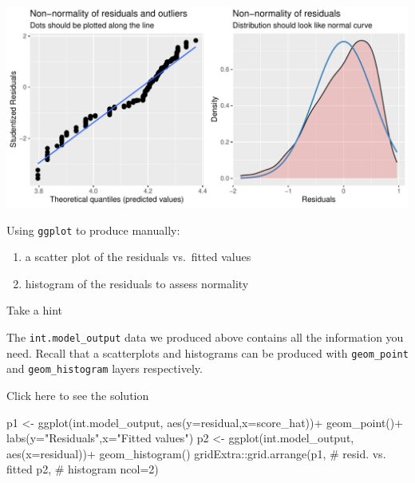 \documentclass[
  letterpaper,
  DIV=11,
  numbers=noendperiod]{scrartcl}
\newenvironment{Shaded}{\begin{snugshade}}{\end{snugshade}}
\newcommand{\AttributeTok}[1]{\textcolor[rgb]{0.40,0.45,0.13}{#1}}
\newcommand{\CommentTok}[1]{\textcolor[rgb]{0.37,0.37,0.37}{#1}}
\newcommand{\DecValTok}[1]{\textcolor[rgb]{0.68,0.00,0.00}{#1}}
\newcommand{\FunctionTok}[1]{\textcolor[rgb]{0.28,0.35,0.67}{#1}}
\newcommand{\NormalTok}[1]{\textcolor[rgb]{0.00,0.23,0.31}{#1}}
\newcommand{\OtherTok}[1]{\textcolor[rgb]{0.00,0.23,0.31}{#1}}
\newcommand{\SpecialCharTok}[1]{\textcolor[rgb]{0.37,0.37,0.37}{#1}}
\newcommand{\StringTok}[1]{\textcolor[rgb]{0.13,0.47,0.30}{#1}}
\providecommand{\tightlist}{%
  \setlength{\itemsep}{0pt}\setlength{\parskip}{0pt}}\usepackage{longtable,booktabs,array}
\begin{document}
\begin{center}
\includegraphics{notes_files/figure-pdf/unnamed-chunk-15-1.pdf}
\end{center}

\begin{tcolorbox}[enhanced jigsaw, colback=white, toptitle=1mm, bottomrule=.15mm, colbacktitle=quarto-callout-warning-color!10!white, breakable, title={Task 2}, colframe=quarto-callout-warning-color-frame, opacitybacktitle=0.6, toprule=.15mm, arc=.35mm, coltitle=black, leftrule=.75mm, bottomtitle=1mm, titlerule=0mm, opacityback=0, rightrule=.15mm, left=2mm]

Using \texttt{ggplot} to produce manually:

\begin{enumerate}
\def\labelenumi{\arabic{enumi}.}
\tightlist
\item
  a scatter plot of the residuals vs.~fitted values
\item
  histogram of the residuals to assess normality
\end{enumerate}

Take a hint

The \texttt{int.model\_output} data we produced above contains all the
information you need. Recall that a scatterplots and histograms can be
produced with \texttt{geom\_point} and \texttt{geom\_histogram} layers
respectively.

Click here to see the solution

\begin{Shaded}
\begin{Highlighting}[]
\NormalTok{p1 }\OtherTok{\textless{}{-}} \FunctionTok{ggplot}\NormalTok{(int.model\_output,}
             \FunctionTok{aes}\NormalTok{(}\AttributeTok{y=}\NormalTok{residual,}\AttributeTok{x=}\NormalTok{score\_hat))}\SpecialCharTok{+}
  \FunctionTok{geom\_point}\NormalTok{()}\SpecialCharTok{+}
  \FunctionTok{labs}\NormalTok{(}\AttributeTok{y=}\StringTok{"Residuals"}\NormalTok{,}\AttributeTok{x=}\StringTok{"Fitted values"}\NormalTok{)}
\NormalTok{p2 }\OtherTok{\textless{}{-}} \FunctionTok{ggplot}\NormalTok{(int.model\_output,}
             \FunctionTok{aes}\NormalTok{(}\AttributeTok{x=}\NormalTok{residual))}\SpecialCharTok{+}
  \FunctionTok{geom\_histogram}\NormalTok{()}
\NormalTok{gridExtra}\SpecialCharTok{::}\FunctionTok{grid.arrange}\NormalTok{(p1, }\CommentTok{\# resid. vs. fitted}
\NormalTok{                        p2, }\CommentTok{\# histogram}
                        \AttributeTok{ncol=}\DecValTok{2}\NormalTok{)}
\end{Highlighting}
\end{Shaded}


\end{tcolorbox}
\end{document}
